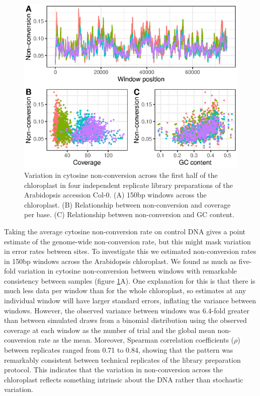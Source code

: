 \documentclass[12pt,longbibliography]{article}
\begin{document}
\begin{figure}
    \includegraphics{figure2.eps}
    \caption{
        Variation in cytosine non-conversion across the first half of the chloroplast in four independent replicate library preparations of the Arabidopsis accession Col-0.
        (A) 150bp windows across the chloroplast.
        (B) Relationship between non-conversion and coverage per base.
        (C) Relationship between non-conversion and GC content.
    }
    \label{fig:uncertainty}
\end{figure}

Taking the average cytosine non-conversion rate on control DNA gives a point estimate of the genome-wide non-conversion rate, but this might mask variation in error rates between sites.
To investigate this we estimated non-conversion rates in 150bp windows across the Arabidopsis chloroplast.
We found as much as five-fold variation in cytosine non-conversion between windows with remarkable consistency between samples (figure \ref{fig:uncertainty}A).
One explanation for this is that there is much less data per window than for the whole chloroplast, so estimates at any individual window will have larger standard errors, inflating the variance between windows.
However, the observed variance between windows was 6.4-fold greater than between simulated draws from a binomial distribution using the observed coverage at each window as the number of trial and the global mean non-conversion rate as the mean.
Moreover, Spearman correlation coefficients ($\rho$) between replicates ranged from 0.71 to 0.84, showing that the pattern was remarkably consistent between technical replicates of the library preparation protocol.
This indicates that the variation in non-conversion across the chloroplast reflects something intrinsic about the DNA rather than stochastic variation.
\end{document}
